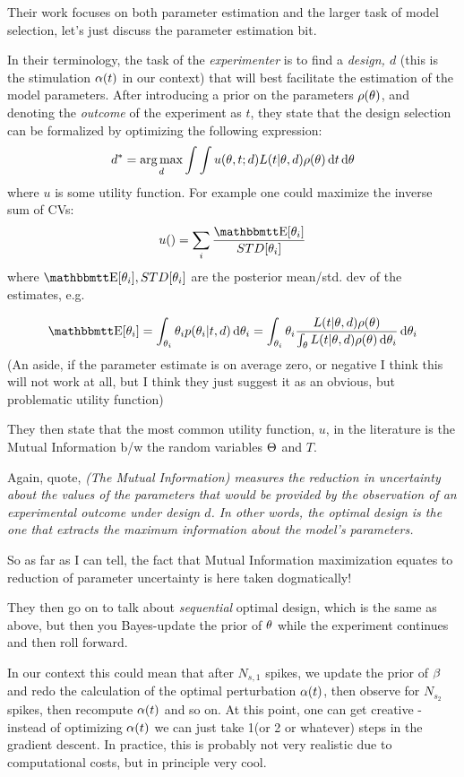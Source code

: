 Their work focuses on both parameter estimation and the larger task of model
selection, let's just discuss the parameter estimation bit. 

In their terminology, the task of the {\sl experimenter}
 is to find a { \sl design, $d$ } (this is the stimulation $\alpha(t)$ in our
 context) that will best facilitate the estimation of the model parameters.
 After introducing a prior on the parameters $\rho({ \theta})$, and denoting the
 {\sl outcome} of the experiment as $t$, they state that the design selection
 can be formalized by optimizing the following expression: $$
d^* =  \argmax_d \int \int u(\th, t; d) L(t| \th, d) \rho (\th) \intd{t}
\intd{\th}
$$
where $u$ is some utility function. For example one could maximize the inverse
sum of CVs:
$$
u() = \sum_i \frac{\Exp[\th_i]}{STD[\th_i]}
$$
where 
$\Exp[\th_i], STD[\th_i]$ are the posterior mean/std. dev of the estimates, e.g.

$$
\Exp[\th_i] = \int_{\th_i} \th_i p(\th_i| t, d) \intd{\th_i} = 
\int_{\th_i} \th_i \frac{ L(t| \th, d) \rho (\th) }
					    {\int_\th L(t| \th, d) \rho (\th)\intd{\th_i} } \intd{\th_i} 
$$
(An aside, if the parameter estimate is on average zero, or negative I think
this will not work at all, but I think they just suggest it as an obvious, but
problematic utility function)

They then state that the most common utility function, $u$, in the
literature is the Mutual Information b/w the random variables ${\Theta}$ and $T$. 

Again, quote, {\sl (The Mutual Information)  measures the reduction in
uncertainty about the values of the parameters that would be provided by the
observation of an experimental outcome under design $d$. In other words, the
optimal design is the one that extracts the maximum information about the
model's parameters.}

So as far as I can tell, the fact that Mutual Information maximization equates
to reduction of parameter uncertainty is here taken dogmatically!

They then go on to talk about { \sl sequential } optimal design, which is the
same as above, but then you Bayes-update the prior of ${ \theta}$ while the experiment
continues and then roll forward. 

In our context this could mean that after $N_{s,1}$ spikes, we update the prior
of $\beta$ and redo the calculation of the optimal perturbation $\alpha(t)$, then
observe for $N_{s_2}$ spikes, then recompute $\alpha(t)$ and so on. At this point,
one can get creative - instead of optimizing $\alpha(t)$ we can just take 1(or 2 or
whatever) steps in the gradient descent. In practice, this is probably
not very realistic due to computational costs, but in principle very cool.


